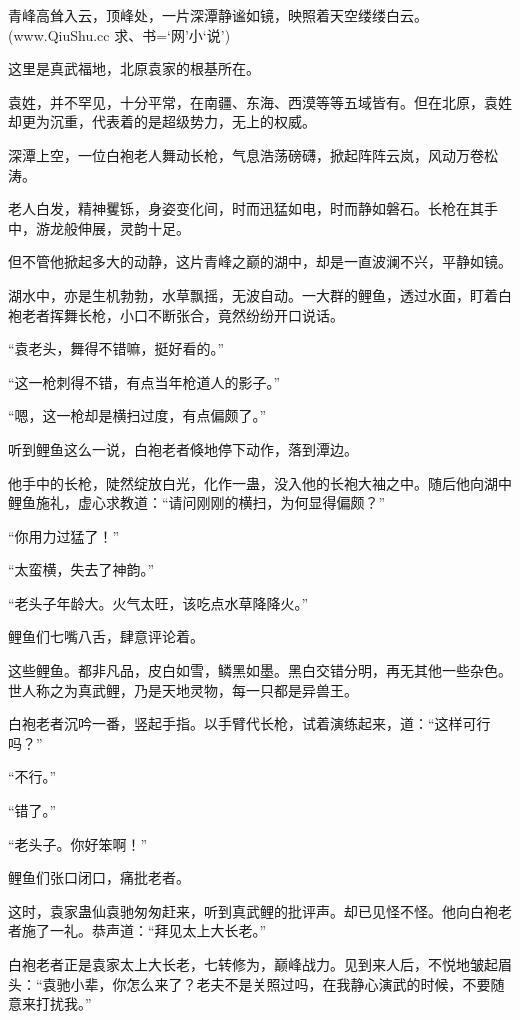
\begin{this_body}

青峰高耸入云，顶峰处，一片深潭静谧如镜，映照着天空缕缕白云。(www.QiuShu.cc 求、书=‘网’小‘说’)

这里是真武福地，北原袁家的根基所在。

袁姓，并不罕见，十分平常，在南疆、东海、西漠等等五域皆有。但在北原，袁姓却更为沉重，代表着的是超级势力，无上的权威。

深潭上空，一位白袍老人舞动长枪，气息浩荡磅礴，掀起阵阵云岚，风动万卷松涛。

老人白发，精神矍铄，身姿变化间，时而迅猛如电，时而静如磐石。长枪在其手中，游龙般伸展，灵韵十足。

但不管他掀起多大的动静，这片青峰之巅的湖中，却是一直波澜不兴，平静如镜。

湖水中，亦是生机勃勃，水草飘摇，无波自动。一大群的鲤鱼，透过水面，盯着白袍老者挥舞长枪，小口不断张合，竟然纷纷开口说话。

“袁老头，舞得不错嘛，挺好看的。”

“这一枪刺得不错，有点当年枪道人的影子。”

“嗯，这一枪却是横扫过度，有点偏颇了。”

听到鲤鱼这么一说，白袍老者倏地停下动作，落到潭边。

他手中的长枪，陡然绽放白光，化作一蛊，没入他的长袍大袖之中。随后他向湖中鲤鱼施礼，虚心求教道：“请问刚刚的横扫，为何显得偏颇？”

“你用力过猛了！”

“太蛮横，失去了神韵。”

“老头子年龄大。火气太旺，该吃点水草降降火。”

鲤鱼们七嘴八舌，肆意评论着。

这些鲤鱼。都非凡品，皮白如雪，鳞黑如墨。黑白交错分明，再无其他一些杂色。世人称之为真武鲤，乃是天地灵物，每一只都是异兽王。

白袍老者沉吟一番，竖起手指。以手臂代长枪，试着演练起来，道：“这样可行吗？”

“不行。”

“错了。”

“老头子。你好笨啊！”

鲤鱼们张口闭口，痛批老者。

这时，袁家蛊仙袁驰匆匆赶来，听到真武鲤的批评声。却已见怪不怪。他向白袍老者施了一礼。恭声道：“拜见太上大长老。”

白袍老者正是袁家太上大长老，七转修为，巅峰战力。见到来人后，不悦地皱起眉头：“袁驰小辈，你怎么来了？老夫不是关照过吗，在我静心演武的时候，不要随意来打扰我。”


\end{this_body}
